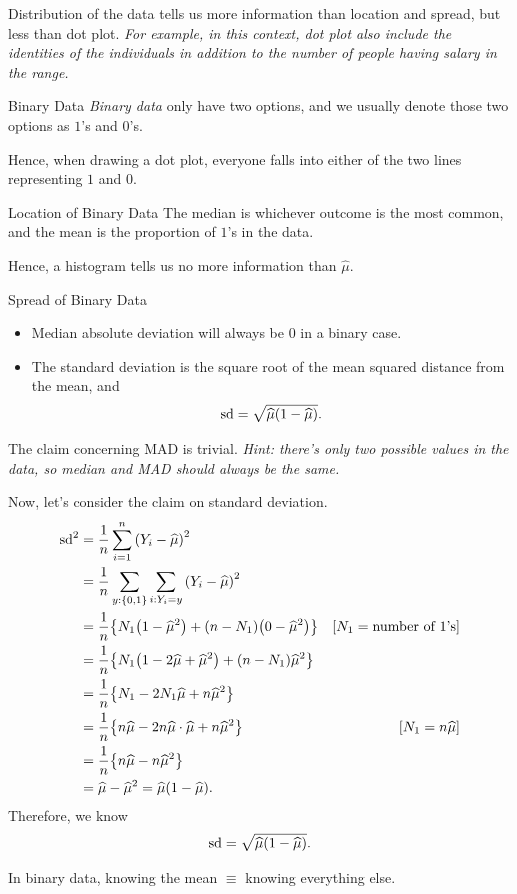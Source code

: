 \begin{rmk}
	Distribution of the data tells us more information than location and spread, but less than dot plot. \emph{For example, in this context, dot plot also include the identities of the individuals in addition to the number of people having salary in the range. }
\end{rmk}
\begin{df}{Binary Data}
	\textit{Binary data} only have two options, and we usually denote those two options as $1$'s and $0$'s. 	
\end{df}
\begin{cor}{}
	Hence, when drawing a dot plot, everyone falls into either of the two lines representing $1$ and $0$.
\end{cor}
\begin{thm}{Location of Binary Data}
	The median is whichever outcome is the most common, and the mean is the proportion of $1$'s in the data. 
\end{thm}
\begin{rmk}
	Hence, a histogram tells us no more information than $\hat\mu$.	
\end{rmk}
\begin{thm}{Spread of Binary Data}
	\begin{itemize}
		\item Median absolute deviation will always be $0$ in a binary case.
		\item The standard deviation is the square root of the mean squared distance from the mean, and \[\text{sd}=\sqrt{\widehat\mu\qty(1-\widehat\mu)}.\]
	\end{itemize}
\end{thm}
\begin{prf}
	The claim concerning MAD is trivial. \textit{Hint: there's only two possible values in the data, so median and MAD should always be the same.}\par Now, let's consider the claim on standard deviation. \begin{align*}\mathrm{sd}^2&=\dfrac{1}{n}\sum_{i=1}^n\qty(Y_i-\widehat\mu)^2\\&=\dfrac{1}{n}\sum_{y:\qty{0,1}}\sum_{i:Y_i=y}\qty(Y_i-\widehat\mu)^2\\&=\dfrac{1}{n}\qty{N_1\qty(1-\widehat\mu^2)+\qty(n-N_1)\qty(0-\widehat\mu^2)}&[N_1=\text{number of }1\text{'s}]\\&=\dfrac{1}{n}\qty{N_1\qty(1-2\widehat\mu+\widehat\mu^2)+\qty(n-N_1)\widehat\mu^2}\\&=\dfrac{1}{n}\qty{N_1-2N_1\widehat\mu+n\widehat\mu^2}\\&=\dfrac{1}{n}\qty{n\widehat\mu-2n\widehat\mu\cdot\widehat\mu+n\widehat\mu^2}&[N_1=n\widehat\mu]\\&=\dfrac{1}{n}\qty{n\widehat\mu-n\widehat\mu^2}\\&=\widehat\mu-\widehat\mu^2=\widehat\mu\qty(1-\widehat\mu).\end{align*} Therefore, we know \[\mathrm{sd}=\sqrt{\widehat\mu\qty(1-\widehat\mu)}.\]
\end{prf}
\begin{rmk}
	In binary data, knowing the mean $\equiv$ knowing everything else. 
\end{rmk}

